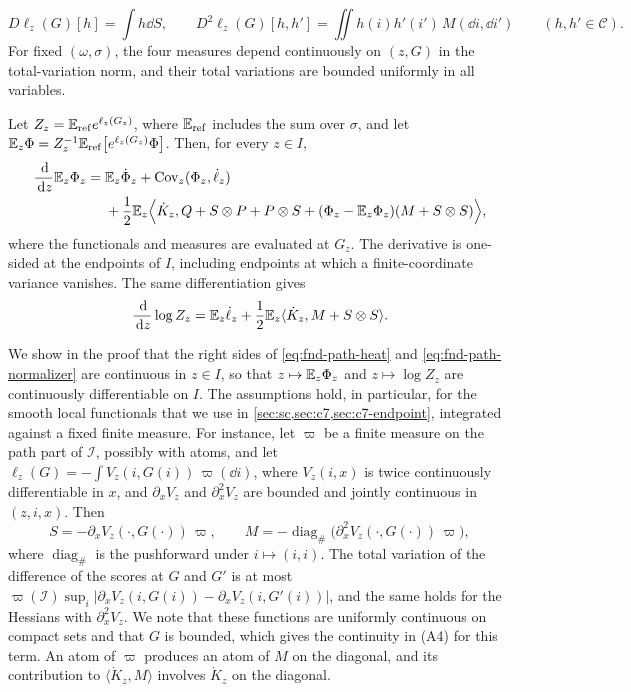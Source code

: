 \begin{lemma}
\begin{enumerate}[label=\textup{(A\arabic*)}]
\[ D\ell_z(G)[h]=\int h\dd S,\qquad
 D^2\ell_z(G)[h,h']=\iint h(i)h'(i')\,M(\dd i,\dd i')
 \qquad(h,h'\in\mathcal C).
\]
For fixed $(\omega,\sigma)$, the four measures depend continuously on
$(z,G)$ in the total-variation norm, and their total variations are
bounded uniformly in all variables.
\end{enumerate}
Let $Z_z=\mathbb E_{\rm ref}e^{\ell_z(G_z)}$, where $\mathbb E_{\rm ref}$ includes the
sum over $\sigma$, and let
$\mathbb E_z\Phi=Z_z^{-1}\mathbb E_{\rm ref}\bigl[e^{\ell_z(G_z)}\Phi\bigr]$. Then, for
every $z\in I$,
\begin{align}
 \frac{\,\mathrm d}{\,\mathrm d z}\mathbb E_z\Phi_z={}&
 \mathbb E_z\dot\Phi_z+\operatorname{Cov}_z(\Phi_z,\dot\ell_z)\nonumber\\
 &+\frac12\mathbb E_z\Bigl\langle\dot K_z,
 Q+S\otimes P+P\otimes S
 +(\Phi_z-\mathbb E_z\Phi_z)(M+S\otimes S)\Bigr\rangle,
 \label{eq:fnd-path-heat}
\end{align}
where the functionals and measures are evaluated at $G_z$. The
derivative is one-sided at the endpoints of $I$, including endpoints at
which a finite-coordinate variance vanishes. The same differentiation
gives
\begin{equation}\label{eq:fnd-path-normalizer}
 \frac{\,\mathrm d}{\,\mathrm d z}\log Z_z
 =\mathbb E_z\dot\ell_z+\frac12\mathbb E_z\langle\dot K_z,M+S\otimes S\rangle.
\end{equation}
\end{lemma}

\begin{remark}\label{rem:gauss-local}
We show in the proof that the right sides of \eqref{eq:fnd-path-heat} and
\eqref{eq:fnd-path-normalizer} are continuous in $z\in I$, so that
$z\mapsto\mathbb E_z\Phi_z$ and $z\mapsto\log Z_z$ are continuously
differentiable on $I$. The assumptions hold, in particular, for the
smooth local functionals that we use in
\cref{sec:sc,sec:c7,sec:c7-endpoint},
integrated against a fixed finite measure. For instance, let $\varpi$ be
a finite measure on the path part of $\mathcal I$, possibly with atoms,
and let $\ell_z(G)=-\int V_z(i,G(i))\,\varpi(\dd i)$, where $V_z(i,x)$
is twice continuously differentiable in $x$, and $\partial_xV_z$ and
$\partial_x^2V_z$ are bounded and jointly continuous in $(z,i,x)$. Then
\[
 S=-\partial_xV_z(\cdot,G(\cdot))\,\varpi,\qquad
 M=-\operatorname{diag}_{\#}\bigl(\partial_x^2V_z(\cdot,G(\cdot))\,\varpi\bigr),
\]
where $\operatorname{diag}_{\#}$ is the pushforward under
$i\mapsto(i,i)$. The total variation of the difference of the scores at
$G$ and $G'$ is at most
$\varpi(\mathcal I)\sup_i|\partial_xV_z(i,G(i))-\partial_xV_z(i,G'(i))|$,
and the same holds for the Hessians with $\partial_x^2V_z$. We note that
these functions are uniformly continuous on compact sets
and that $G$ is bounded, which gives the continuity in (A4) for this
term. An atom of $\varpi$ produces an atom of $M$ on
the diagonal, and its contribution to $\langle\dot K_z,M\rangle$
involves $\dot K_z$ on the diagonal.
\end{remark}

